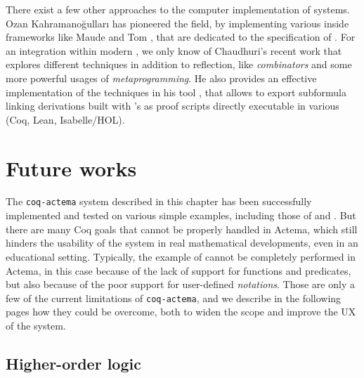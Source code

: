\begin{remark}
  There exist a few other approaches to the computer implementation of  systems. Ozan Kahramanoğulları has pioneered the field, by
  implementing various  inside frameworks like Maude
  \cite{kahramanogullari_maude_2008} and Tom
  \cite{kahramanogullari_implementing_2005}, that are dedicated to the
  specification of . For an integration within modern , we only know of Chaudhuri's recent work
   that explores different techniques in
  addition to reflection, like \emph{combinators} and some more powerful usages
  of \emph{metaprogramming}. He also provides an effective implementation of the
  techniques in his  tool \cite{DBLP:conf/cade/Chaudhuri21}, that
  allows to export subformula linking derivations built with 's 
  as proof scripts directly executable in various  (Coq, Lean,
  Isabelle/HOL).
\end{remark}

\section{Future works}

The \texttt{coq-actema} system described in this chapter has been successfully
implemented and tested on various simple examples, including those of
 and . But there are many Coq goals that cannot be
properly handled in Actema, which still hinders the usability of the system in
real mathematical developments, even in an educational setting. Typically, the
example of  cannot be completely performed in Actema, in this case
because of the lack of support for \emph{} functions and predicates,
but also because of the poor support for user-defined \emph{notations}. Those
are only a few of the current limitations of \texttt{coq-actema}, and we
describe in the following pages how they could be overcome, both to widen the
scope and improve the UX of the system.

\subsection{Higher-order logic}


